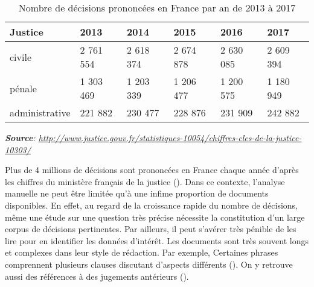 \begin{table}[!htb]
 	\small
 	\begin{center}
 		\begin{tabular}{|l|l|l|l|l|l|}
 			\hline
 			\textbf{Justice}	& \textbf{2013}  & \textbf{2014}  & \textbf{2015}  & \textbf{2016}  & \textbf{2017}  \\ \hline
 			civile   & 2 761 554 & 2 618 374 & 2 674 878 & 2 630 085 & 2 609 394 \\ \hline
 			pénale   & 1 303 469 & 1 203 339 & 1 206 477 & 1 200 575 & 1 180 949 \\ \hline
 			administrative & 221 882 & 230 477 & 228 876 & 231 909 & 242 882 \\ \hline
 		\end{tabular}
 		
 		\textit{\scriptsize{\textbf{Source}: \url{http://www.justice.gouv.fr/statistiques-10054/chiffres-cles-de-la-justice-10303/}}}  
 	\end{center}
 	\caption{Nombre de décisions prononcées en France par an de 2013 à 2017}\label{tab:intro:nbdecisionstats}
 \end{table}
Plus de 4 millions de décisions sont prononcées en France chaque année d'après les chiffres du ministère français de la justice (). Dans ce contexte, l'analyse manuelle ne peut être limitée qu'à une infime proportion de documents disponibles.
En effet, au regard de la croissance rapide du nombre de décisions, même une étude sur une question très précise nécessite la constitution d'un large corpus de décisions pertinentes. Par ailleurs, il peut s'avérer très pénible de les lire pour en identifier les données d'intérêt. Les documents sont très souvent longs et complexes dans leur style de rédaction. Par exemple, Certaines phrases comprennent plusieurs clauses discutant d'aspects différents (). On y retrouve aussi des références à des jugements antérieurs ().
